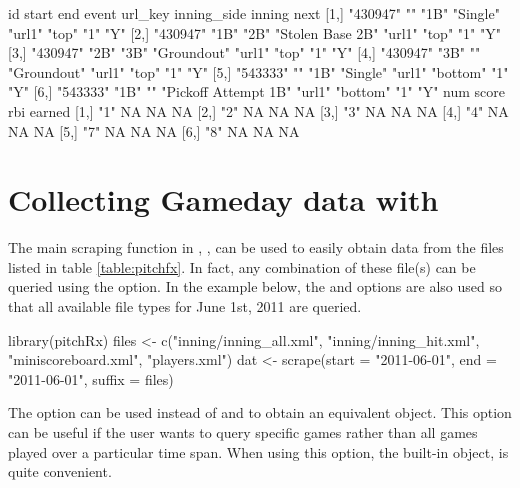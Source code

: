 \begin{article}
\begin{Schunk}
\begin{Soutput}
     id       start end  event                url_key inning_side inning next
[1,] "430947" ""    "1B" "Single"             "url1"  "top"       "1"    "Y" 
[2,] "430947" "1B"  "2B" "Stolen Base 2B"     "url1"  "top"       "1"    "Y" 
[3,] "430947" "2B"  "3B" "Groundout"          "url1"  "top"       "1"    "Y" 
[4,] "430947" "3B"  ""   "Groundout"          "url1"  "top"       "1"    "Y" 
[5,] "543333" ""    "1B" "Single"             "url1"  "bottom"    "1"    "Y" 
[6,] "543333" "1B"  ""   "Pickoff Attempt 1B" "url1"  "bottom"    "1"    "Y" 
     num score rbi earned
[1,] "1" NA    NA  NA    
[2,] "2" NA    NA  NA    
[3,] "3" NA    NA  NA    
[4,] "4" NA    NA  NA    
[5,] "7" NA    NA  NA    
[6,] "8" NA    NA  NA    
\end{Soutput}
\end{Schunk}



\section{Collecting Gameday data with }

The main scraping function in , , can
be used to easily obtain data from the files listed in table \ref{table:pitchfx}.
In fact, any combination of these file(s) can be queried using the
 option. In the example below, the  and
 options are also used so that all available file types
for June 1st, 2011 are queried.

\begin{Schunk}
\begin{Sinput}
library(pitchRx)
files <- c("inning/inning_all.xml", "inning/inning_hit.xml", 
		"miniscoreboard.xml", "players.xml")
dat <- scrape(start = "2011-06-01", end = "2011-06-01", suffix = files)
\end{Sinput}
\end{Schunk}


The  option can be used instead of  and
 to obtain an equivalent  object. This option
can be useful if the user wants to query specific games rather than
all games played over a particular time span. When using this 
option, the built-in  object, is quite convenient.


\end{article}
